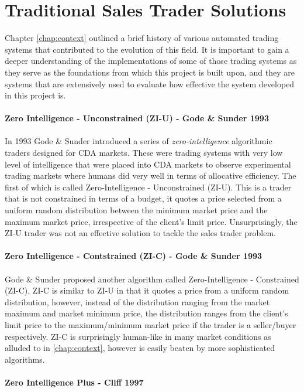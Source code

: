 \documentclass[ %
                    author={Ashwinder Khurana},
                supervisor={Prof Dave Cliff},
                    degree={MEng},
                     title={The Deeply Reinforced Trader},
                  subtitle={},
                      type={enterprise},
                      year={2020} ]{dissertation}
\begin{document}
\section{Traditional Sales Trader Solutions}
\label{section:Traditional Sales Trader Solutions}
Chapter \ref{chap:context} outlined a brief history of various automated trading systems that contributed to the evolution of this field. It is important to gain a deeper understanding of the implementations of some of those trading systems as they serve as the foundations from which this project is built upon, and they are systems that are extensively used to evaluate how effective the system developed in this project is. 
\\
\\
\textbf{Zero Intelligence - Unconstrained (ZI-U) - Gode \& Sunder 1993}
\\
\\
\noindent
In 1993 Gode \& Sunder introduced a series of \textit{zero-intelligence} algorithmic traders designed for CDA markets. These were trading systems with very low level of intelligence that were placed into CDA markets to observe experimental trading markets where humans did very well in terms of allocative efficiency. The first of which is called Zero-Intelligence - Unconstrained (ZI-U). This is a trader that is not constrained in terms of a budget, it quotes a price selected from a uniform random distribution between the minimum market price and the maximum market price, irrespective of the client's limit price. Unsurprisingly, the ZI-U trader was not an effective solution to tackle the sales trader problem. 
\\
\\
\textbf{Zero Intelligence - Contstrained (ZI-C) - Gode \& Sunder 1993}\\
\\
Gode \& Sunder proposed another algorithm called Zero-Intelligence - Constrained (ZI-C). ZI-C is similar to ZI-U in that it quotes a price from a uniform random distribution, however, instead of the distribution ranging from the market maximum and market minimum price, the distribution ranges from the client's limit price to the maximum/minimum market price if the trader is a seller/buyer respectively. ZI-C is surprisingly human-like in many market conditions as alluded to in \ref{chap:context}, however is easily beaten by more sophisticated algorithms. 
\\
\\
\textbf{Zero Intelligence Plus - Cliff 1997}
\\
\end{document}
